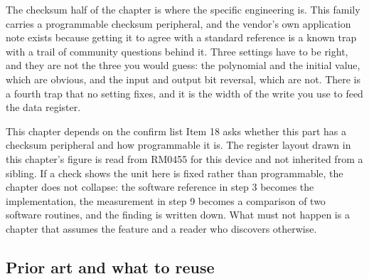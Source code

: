 The checksum half of the chapter is where the specific engineering is. This
family carries a programmable checksum peripheral, and the vendor's own
application note exists because getting it to agree with a standard reference is
a known trap with a trail of community questions behind it. Three settings have
to be right, and they are not the three you would guess: the polynomial and the
initial value, which are obvious, and the input and output bit reversal, which
are not. There is a fourth trap that no setting fixes, and it is the width of
the write you use to feed the data register.

\begin{note}{This chapter depends on the confirm list}
Item 18 asks whether this part has a checksum peripheral and how programmable it
is. The register layout drawn in this chapter's figure is read from RM0455 for
this device and not inherited from a sibling. If a check shows the unit here is
fixed rather than programmable, the chapter does not collapse: the software
reference in step 3 becomes the implementation, the measurement in step 9 becomes
a comparison of two software routines, and the finding is written down. What
must not happen is a chapter that assumes the feature and a reader who discovers
otherwise.
\end{note}

\subsection*{Prior art and what to reuse}

